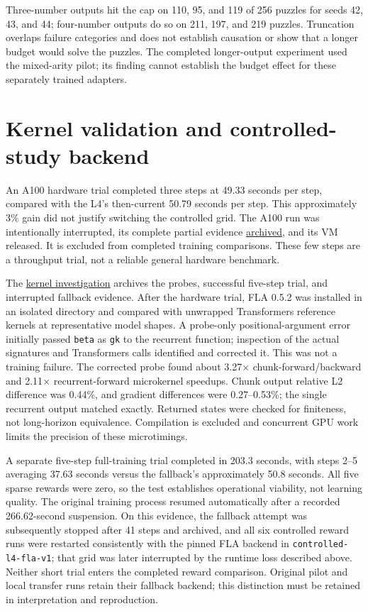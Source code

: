 \documentclass[11pt]{article}
\begin{document}
Three-number outputs hit the cap on 110, 95, and 119 of 256 puzzles for seeds
42, 43, and 44; four-number outputs do so on 211, 197, and 219 puzzles.
Truncation overlaps failure categories and does not establish causation or show
that a longer budget would solve the puzzles. The completed longer-output
experiment used the mixed-arity pilot; its finding cannot establish the budget
effect for these separately trained adapters.

\section{Kernel validation and controlled-study backend}
An A100 hardware trial completed three steps at 49.33 seconds per step, compared
with the L4's then-current 50.79 seconds per step. This approximately 3\% gain
did not justify switching the controlled grid. The A100 run was intentionally
interrupted, its complete partial evidence
\href{https://wandb.ai/mohamedsobhi777/countdown-grpo/runs/rat7r34m}{archived},
and its VM released. It is excluded from completed training comparisons. These
few steps are a throughput trial, not a reliable general hardware benchmark.


The \href{https://wandb.ai/mohamedsobhi777/countdown-grpo/runs/jk9p648k}{kernel investigation}
archives the probes, successful five-step trial, and interrupted fallback evidence.
After the hardware trial, FLA 0.5.2 was installed in an isolated directory and
compared with unwrapped Transformers reference kernels at representative model
shapes. A probe-only positional-argument error initially passed \texttt{beta} as
\texttt{gk} to the recurrent function; inspection of the actual signatures and
Transformers calls identified and corrected it. This was not a training failure.
The corrected probe found about 3.27$\times$ chunk-forward/backward and
2.11$\times$ recurrent-forward microkernel speedups. Chunk output relative L2
difference was 0.44\%, and gradient differences were 0.27--0.53\%; the single
recurrent output matched exactly. Returned states were checked for finiteness,
not long-horizon equivalence. Compilation is excluded and concurrent GPU work
limits the precision of these microtimings.

A separate five-step full-training trial completed in 203.3 seconds, with steps
2--5 averaging 37.63 seconds versus the fallback's approximately 50.8 seconds.
All five sparse rewards were zero, so the test establishes operational viability,
not learning quality. The original training process resumed automatically after
a recorded 266.62-second suspension. On this evidence, the fallback attempt was
subsequently stopped after 41 steps and archived, and all six controlled reward
runs were restarted consistently with the pinned FLA backend in
\texttt{controlled-l4-fla-v1}; that grid was later interrupted by the runtime
loss described above. Neither short trial enters the completed reward
comparison. Original pilot and local transfer runs retain their fallback backend;
this distinction must be retained in interpretation and reproduction.
\end{document}

